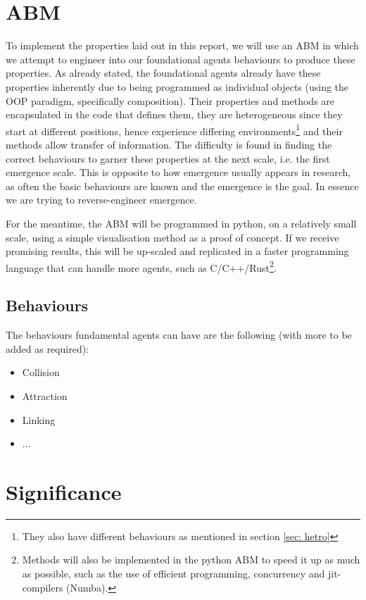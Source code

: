 \documentclass{article}
\begin{document}
\section{ABM}

  To implement the properties laid out in this report, we will use an ABM in which we attempt to engineer into our foundational agents behaviours to produce these properties. As already stated, the foundational agents already have these properties inherently due to being programmed as individual objects (using the OOP paradigm, specifically composition). Their properties and methods are encapsulated in the code that defines them, they are heterogeneous since they start at different positions, hence experience differing environments\footnote{They also have different behaviours as mentioned in section \ref{sec: hetro}} and their methods allow transfer of information. The difficulty is found in finding the correct behaviours to garner these properties at the next scale, i.e. the first emergence scale. This is opposite to how emergence usually appears in research, as often the basic behaviours are known and the emergence is the goal. In essence we are trying to reverse-engineer emergence.

    For the meantime, the ABM will be programmed in python, on a relatively small scale, using a simple visualisation method as a proof of concept. If we receive promising results, this will be up-scaled and replicated in a faster programming language that can handle more agents, such as C/C++/Rust\footnote{Methods will also be implemented in the python ABM to speed it up as much as possible, such as the use of efficient programming, concurrency and jit-compilers (Numba).}. 

    \subsection{Behaviours}
      
      The behaviours fundamental agents can have are the following (with more to be added as required):

      \begin{itemize}
        \item Collision
        \item Attraction
        \item Linking
        \item ...
      \end{itemize}


\section{Significance}
\end{document}
